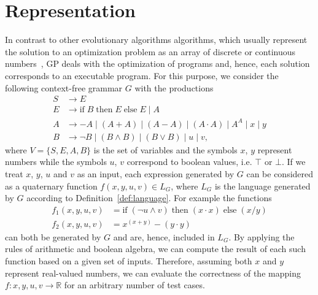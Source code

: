 \section{Representation}
In contrast to other evolutionary algorithms algorithms, which usually represent the solution to an optimization problem as an array of discrete or continuous numbers~\cite{back1997handbook}, GP deals with the optimization of programs and, hence, each solution corresponds to an executable program.
For this purpose, we consider the following context-free grammar $G$ with the productions
\begin{equation}
	\begin{split}
		S & \to E \\
		E & \to \text{if} \; B \; \text{then} \; E \; \text{else} \; E \; | \; A \\
		A & \to -A \; | \; (A + A) \; | \; (A - A) \; | \; (A \cdot A) \; | \; A^A \; | \; x \; | \; y \\  
		B & \to \neg B \; | \; (B \wedge B) \; | \; (B \vee B) \; | \; u \; | \; v,
	\end{split}
\label{eq:gp-example-grammar}
\end{equation}
where $V = \{S, E, A, B\}$ is the set of variables and the symbols $x$, $y$ represent numbers while the symbols $u$, $v$ correspond to boolean values, i.e. $\top$ or $\bot$.
If we treat $x$, $y$, $u$ and $v$ as an input, each expression generated by $G$ can be considered as a quaternary function $f(x,y,u,v) \in L_{G}$, where $L_G$ is the language generated by $G$ according to Definition~\ref{def:language}.
For example the functions
\begin{equation}
	\begin{split}
		f_1(x,y,u,v) & = \text{if} \; (\neg u \wedge v) \; \text{then} \; (x \cdot x) \; \text{else} \; (x / y) \\
		f_2(x,y,u,v) & = x^{(x + y)} - (y \cdot y)
	\end{split}
\label{eq:gp-example-functions}
\end{equation} can both be generated by $G$ and are, hence, included in $L_G$.
By applying the rules of arithmetic and boolean algebra, we can compute the result of each such function based on a given set of inputs.
Therefore, assuming both $x$ and $y$ represent real-valued numbers, we can evaluate the correctness of the mapping $f : x, y, u, v \to \mathbb{R}$ for an arbitrary number of test cases.
